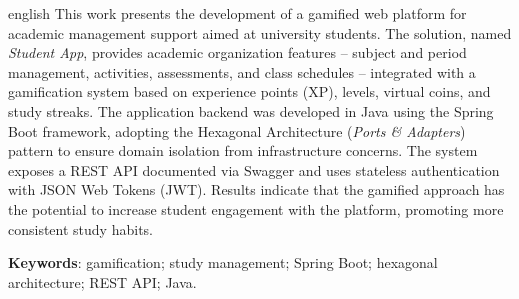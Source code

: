 \documentclass[
  12pt,             %
  openright,        %
  twoside,          %
  a4paper,          %
  english,          %
  brazilian         %
]{abntex2}
\begin{document}
\begin{resumo}[Abstract]
  \begin{otherlanguage*}{english}
    This work presents the development of a gamified web platform for academic
    management support aimed at university students. The solution, named
    \textit{Student App}, provides academic organization features -- subject and period
    management, activities, assessments, and class schedules -- integrated with a
    gamification system based on experience points (XP), levels, virtual coins, and
    study streaks. The application backend was developed in Java using the Spring Boot
    framework, adopting the Hexagonal Architecture (\textit{Ports \& Adapters}) pattern
    to ensure domain isolation from infrastructure concerns. The system exposes a
    REST API documented via Swagger and uses stateless authentication with JSON Web
    Tokens (JWT). Results indicate that the gamified approach has the potential to
    increase student engagement with the platform, promoting more consistent study
    habits.

    \vspace{\onelineskip}
    \noindent
    \textbf{Keywords}: gamification; study management; Spring Boot; hexagonal
    architecture; REST API; Java.
  \end{otherlanguage*}
\end{resumo}

\listoffigures*
\cleardoublepage

\listoftables*
\cleardoublepage
\end{document}
